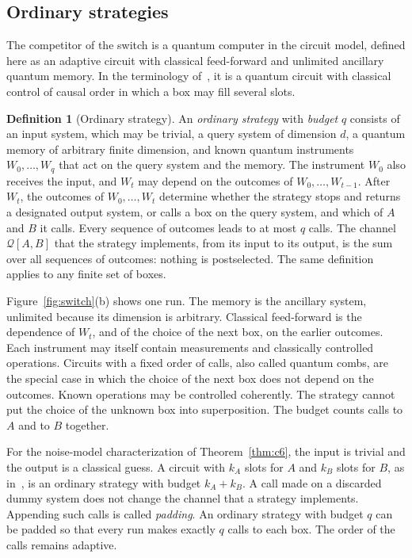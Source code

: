 \documentclass[11pt,letterpaper]{article}
\theoremstyle{definition}\newtheorem{definition}[theorem]{Definition}
\newcommand{\QC}{\mathcal Q}
\newcommand{\reffig}[1]{Figure~\ref{#1}}
\begin{document}
\subsection{Ordinary strategies}\label{sec:model}

The competitor of the switch is a quantum computer in the circuit
model, defined here as an adaptive circuit with classical
feed-forward and unlimited ancillary quantum memory. In the terminology
of~\cite{wechs2021}, it is a quantum circuit with classical
control of causal order in which a box may fill several slots.

\begin{definition}[Ordinary strategy]\label{def:ordinary}
An \emph{ordinary strategy} with \emph{budget} $q$ consists of an input
system, which may be trivial, a query system of dimension $d$, a quantum
memory of arbitrary finite dimension, and known quantum instruments
$W_0,\dots,W_q$ that act on the query system and the memory. The
instrument $W_0$ also receives the input, and $W_t$ may depend on the
outcomes of $W_0,\dots,W_{t-1}$. After $W_t$, the outcomes of $W_0,\dots,W_t$
determine whether the strategy stops and returns a designated output
system, or calls a box on the query system, and which of $A$ and $B$ it
calls.
Every sequence of outcomes leads to at most $q$ calls. The channel
$\QC[A,B]$ that the strategy implements, from its input to its output,
is the sum over all sequences of outcomes: nothing is postselected. The
same definition applies to any finite set of boxes.
\end{definition}

\reffig{fig:switch}(b) shows one run. The memory is the ancillary
system, unlimited because its dimension is arbitrary.
Classical feed-forward is the dependence of $W_t$, and of the choice of
the next box, on the earlier outcomes. Each instrument may itself
contain measurements and classically controlled operations. Circuits with a fixed order of calls, also called quantum
combs, are the special case in which the choice of the next box does not
depend on the outcomes.
Known operations may be controlled coherently. The strategy cannot
put the choice of the unknown box into superposition. The budget
counts calls to $A$ and to $B$ together.

For the noise-model characterization of Theorem~\ref{thm:c6}, the
input is trivial and the output is a classical guess. A circuit with $k_A$ slots for $A$ and
$k_B$ slots for $B$, as in~\cite{bavaresco2025}, is an ordinary strategy
with budget $k_A+k_B$. A call made on a discarded dummy system does not
change the channel that a strategy implements. Appending such calls is
called \emph{padding}. An ordinary strategy with budget $q$ can be padded so
that every run makes exactly $q$ calls to each box. The order of the
calls remains adaptive.
\end{document}
